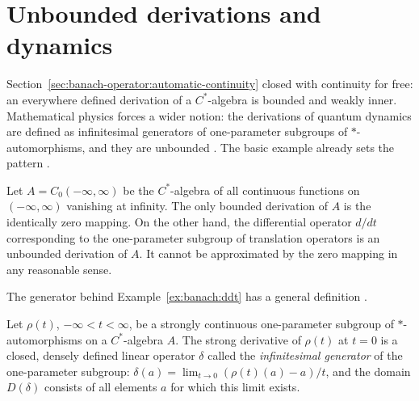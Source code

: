 \section{Unbounded derivations and dynamics}\label{sec:banach-operator:unbounded}

Section~\ref{sec:banach-operator:automatic-continuity} closed with
continuity for free: an everywhere defined derivation of a $C^*$-algebra
is bounded and weakly inner. Mathematical physics forces a wider notion:
the derivations of quantum dynamics are defined as infinitesimal
generators of one-parameter subgroups of $*$-automorphisms, and they are
unbounded \cite[p.~427]{Sakai1976OneParameter}. The basic example already
sets the pattern \cite[pp.~427--428]{Sakai1976OneParameter}.

\begin{example}\label{ex:banach:ddt}
Let $A=C_0(-\infty,\infty)$ be the $C^*$-algebra of all continuous
functions on $(-\infty,\infty)$ vanishing at infinity. The only bounded
derivation of $A$ is the identically zero mapping. On the other hand, the
differential operator $d/dt$ corresponding to the one-parameter subgroup
of translation operators is an unbounded derivation of $A$. It cannot be
approximated by the zero mapping in any reasonable sense.
\end{example}

The generator behind Example~\ref{ex:banach:ddt} has a general
definition \cite[p.~428]{Sakai1976OneParameter}.

\begin{definition}\label{def:banach:generator}
Let $\rho(t)$, $-\infty<t<\infty$, be a strongly continuous one-parameter
subgroup of $*$-automorphisms on a $C^*$-algebra $A$. The strong
derivative of $\rho(t)$ at $t=0$ is a closed, densely defined linear
operator $\delta$ called the \emph{infinitesimal generator} of the
one-parameter subgroup:
$\delta(a)=\lim_{t\to 0}(\rho(t)(a)-a)/t$, and the domain $D(\delta)$
consists of all elements $a$ for which this limit exists.
\end{definition}

